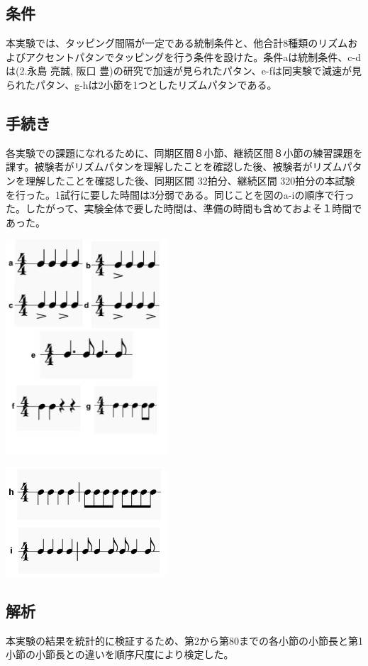 \documentclass[twocolumn,10pt]{jarticle}
\begin{document}
\subsection{条件}
本実験では、タッピング間隔が一定である統制条件と、他合計8種類のリズムおよびアクセントパタンでタッピングを行う条件を設けた。条件aは統制条件、c-dは(2.永島 亮誠, 阪口 豊)の研究で加速が見られたパタン、e-fは同実験で減速が見られたパタン、g-hは2小節を1つとしたリズムパタンである。

\subsection{手続き}
各実験での課題になれるために、同期区間８小節、継続区間８小節の練習課題を課す。被験者がリズムパタンを理解したことを確認した後、被験者がリズムパタンを理解したことを確認した後、同期区間 32拍分、継続区間 320拍分の本試験を行った。1試行に要した時間は3分弱である。同じことを図のa-iの順序で行った。したがって、実験全体で要した時間は、準備の時間も含めておよそ１時間であった。
\begin{center}
	\includegraphics[width=6cm]{patna_g.jpeg}
\end{center}	
\begin{center}
	\includegraphics[width=6cm]{patnh_i.jpeg}
\end{center}	

\subsection{解析}
本実験の結果を統計的に検証するため、第2から第80までの各小節の小節長と第1小節の小節長との違いを順序尺度により検定した。
\end{document}
